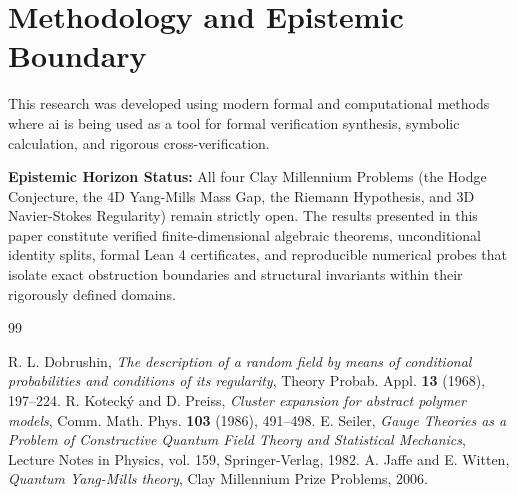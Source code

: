 \documentclass[11pt,a4paper]{article}
\theoremstyle{definition}
\begin{document}
\section{Methodology and Epistemic Boundary}
\noindent This research was developed using modern formal and computational methods where ai is being used as a tool for formal verification synthesis, symbolic calculation, and rigorous cross-verification.

\vspace{0.5em}
\noindent\textbf{Epistemic Horizon Status:} All four Clay Millennium Problems (the Hodge Conjecture, the 4D Yang-Mills Mass Gap, the Riemann Hypothesis, and 3D Navier-Stokes Regularity) remain strictly open. The results presented in this paper constitute verified finite-dimensional algebraic theorems, unconditional identity splits, formal Lean 4 certificates, and reproducible numerical probes that isolate exact obstruction boundaries and structural invariants within their rigorously defined domains.

\begin{thebibliography}{99}

 R. L. Dobrushin, \emph{The description of a random field by means of conditional probabilities and conditions of its regularity}, Theory Probab. Appl. \textbf{13} (1968), 197--224.
 R. Koteck\'y and D. Preiss, \emph{Cluster expansion for abstract polymer models}, Comm. Math. Phys. \textbf{103} (1986), 491--498.
 E. Seiler, \emph{Gauge Theories as a Problem of Constructive Quantum Field Theory and Statistical Mechanics}, Lecture Notes in Physics, vol. 159, Springer-Verlag, 1982.
 A. Jaffe and E. Witten, \emph{Quantum Yang-Mills theory}, Clay Millennium Prize Problems, 2006.

\end{thebibliography}
\end{document}
